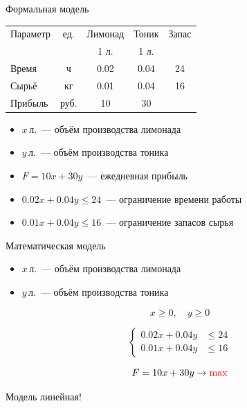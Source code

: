 \documentclass[unicode,11pt,notheorems]{beamer}
\begin{document}
	\begin{frame}{Формальная модель}{}
		\centering
		\begin{tabular}{|l|c|c|c|c|}
			\hline
			\rowcolor{cyan!40} Параметр& ед. & Лимонад & Тоник  & Запас\\
			\rowcolor{cyan!40}& & 1 л.  & 1 л. & \\
			\hline
			Время  & ч & 0.02 & 0.04 & 24\\
			Сырьё  & кг & 0.01 & 0.04 & 16\\
			\hline
			Прибыль & руб. & 10 & 30 &\\
			\hline
		\end{tabular}
		
		
		\bigskip
		
		\begin{itemize}
			\item \alert{$x$}\,л.~--- объём производства лимонада
			\item \alert{$y$}\,л.~--- объём производства тоника
			\item \alert{$F=10x+30y$}~--- ежедневная прибыль
			\item \alert{$0.02x+0.04y \leqslant 24$}~--- ограничение времени работы
			\item \alert{$0.01x+0.04y \leqslant 16$}~--- ограничение запасов сырья
		\end{itemize}
	\end{frame}
	
	\begin{frame}{Математическая модель}{}
		
		\begin{itemize}
			\item \alert{$x$}\,л.~--- объём производства лимонада
			\item \alert{$y$}\,л.~--- объём производства тоника
		\end{itemize}
		
		$$
		x \geqslant 0,\quad y \geqslant 0
		$$
		
		$$
		\left\lbrace \begin{aligned}
		0.02x+0.04y &\leqslant 24\\
		0.01x+0.04y &\leqslant 16
		\end{aligned}\right.
		$$
		
		$$
		F=10x+30y \to {\color{red}\max}
		$$
		
		\alert{Модель линейная!}
	\end{frame}
	
\end{document}
